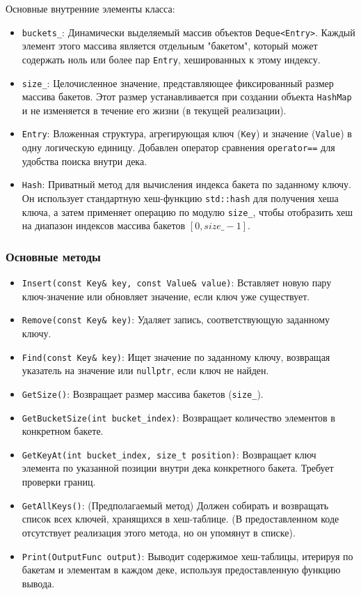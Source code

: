 \documentclass[a4paper,12pt]{article}
\begin{document}
Основные внутренние элементы класса:
\begin{itemize}
    \item \texttt{buckets\_}: Динамически выделяемый массив объектов \texttt{Deque<Entry>}. Каждый элемент этого массива является отдельным "бакетом", который может содержать ноль или более пар \texttt{Entry}, хешированных к этому индексу.
    \item \texttt{size\_}: Целочисленное значение, представляющее фиксированный размер массива бакетов. Этот размер устанавливается при создании объекта \texttt{HashMap} и не изменяется в течение его жизни (в текущей реализации).
    \item \texttt{Entry}: Вложенная структура, агрегирующая ключ (\texttt{Key}) и значение (\texttt{Value}) в одну логическую единицу. Добавлен оператор сравнения \texttt{operator==} для удобства поиска внутри дека.
    \item \texttt{Hash}: Приватный метод для вычисления индекса бакета по заданному ключу. Он использует стандартную хеш-функцию \texttt{std::hash} для получения хеша ключа, а затем применяет операцию по модулю \texttt{size\_}, чтобы отобразить хеш на диапазон индексов массива бакетов \([0, size\_ - 1]\).
\end{itemize}

\subsubsection{Основные методы}

\begin{itemize}
    \item \texttt{Insert(const Key\& key, const Value\& value)}: Вставляет новую пару ключ-значение или обновляет значение, если ключ уже существует.
    \item \texttt{Remove(const Key\& key)}: Удаляет запись, соответствующую заданному ключу.
    \item \texttt{Find(const Key\& key)}: Ищет значение по заданному ключу, возвращая указатель на значение или \texttt{nullptr}, если ключ не найден.
    \item \texttt{GetSize()}: Возвращает размер массива бакетов (\texttt{size\_}).
    \item \texttt{GetBucketSize(int bucket\_index)}: Возвращает количество элементов в конкретном бакете.
    \item \texttt{GetKeyAt(int bucket\_index, size\_t position)}: Возвращает ключ элемента по указанной позиции внутри дека конкретного бакета. Требует проверки границ.
    \item \texttt{GetAllKeys()}: (Предполагаемый метод) Должен собирать и возвращать список всех ключей, хранящихся в хеш-таблице. (В предоставленном коде отсутствует реализация этого метода, но он упомянут в списке).
    \item \texttt{Print(OutputFunc output)}: Выводит содержимое хеш-таблицы, итерируя по бакетам и элементам в каждом деке, используя предоставленную функцию вывода.
\end{itemize}
\end{document}
